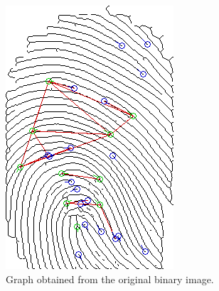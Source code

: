 \documentclass[8pt]{article}
\begin{document}
\begin{figure}
	\centering
	\begin{subfigure}{.48\textwidth}
		\centering
		\includegraphics[width=0.9\linewidth]{img/c-final}
		\caption{Graph obtained from the original binary image.}
					\label{fig:concl-c}
	\end{subfigure}%
	\hfill
	\begin{subfigure}{.48\textwidth}
		\centering

\end{subfigure}
\end{figure}
\end{document}
